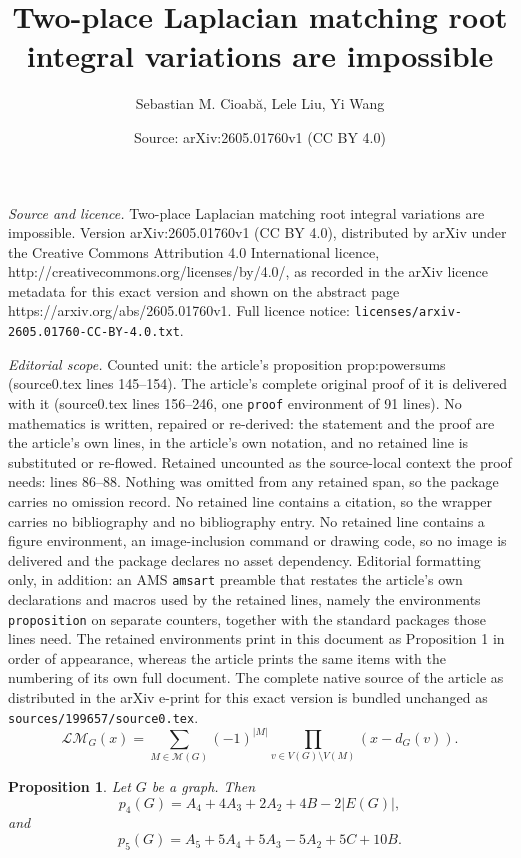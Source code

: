 \documentclass[10pt,a4paper]{amsart}
\title{Two-place Laplacian matching root integral variations are impossible}
\author{Sebastian M. Cioab\u{a}, Lele Liu, Yi Wang}
\date{Source: arXiv:2605.01760v1 (CC BY 4.0)}
\newtheorem{proposition}{Proposition}
\newcommand{\LM}{\mathscr{LM}}
\newcommand{\calM}{\mathcal{M}}
\begin{document}
\maketitle

\noindent\emph{Source and licence.} Two-place Laplacian matching root integral variations are impossible. Version arXiv:2605.01760v1 (CC BY 4.0), distributed by arXiv under the Creative Commons Attribution 4.0 International licence, http://creativecommons.org/licenses/by/4.0/, as recorded in the arXiv licence metadata for this exact version and shown on the abstract page https://arxiv.org/abs/2605.01760v1. Full licence notice: \texttt{licenses/arxiv-2605.01760-CC-BY-4.0.txt}.\par\smallskip

\noindent\textit{Editorial scope.} Counted unit: the article's proposition prop:powersums (source0.tex lines 145--154). The article's complete original proof of it is delivered with it (source0.tex lines 156--246, one \texttt{proof} environment of 91 lines). No mathematics is written, repaired or re-derived: the statement and the proof are the article's own lines, in the article's own notation, and no retained line is substituted or re-flowed.  Retained uncounted as the source-local context the proof needs: lines 86--88.  Nothing was omitted from any retained span, so the package carries no omission record.  No retained line contains a citation, so the wrapper carries no bibliography and no bibliography entry.  No retained line contains a figure environment, an image-inclusion command or drawing code, so no image is delivered and the package declares no asset dependency.  Editorial formatting only, in addition: an AMS \texttt{amsart} preamble that restates the article's own declarations and macros used by the retained lines, namely the environments \texttt{proposition} on separate counters, together with the standard packages those lines need.  The retained environments print in this document as Proposition 1 in order of appearance, whereas the article prints the same items with the numbering of its own full document.  The complete native source of the article as distributed in the arXiv e-print for this exact version is bundled unchanged as \texttt{sources/199657/source0.tex}.
\begin{equation}\label{eq:LMdef}
\LM_G(x)=\sum_{M\in \calM(G)}(-1)^{|M|}\prod_{v\in V(G)\setminus V(M)}(x-d_G(v)).
\end{equation}

\begin{proposition}\label{prop:powersums}
Let $G$ be a graph. Then
\[
p_4(G)=A_4+4A_3+2A_2+4B-2|E(G)|,
\]
and
\[
p_5(G)=A_5+5A_4+5A_3-5A_2+5C+10B.
\]
\end{proposition}
\end{document}
